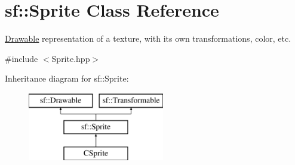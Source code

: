 \hypertarget{classsf_1_1Sprite}{\section{sf\-:\-:Sprite Class Reference}
\label{classsf_1_1Sprite}
}


\hyperlink{classsf_1_1Drawable}{Drawable} representation of a texture, with its own transformations, color, etc.  




{\ttfamily \#include $<$Sprite.\-hpp$>$}

Inheritance diagram for sf\-:\-:Sprite\-:\begin{figure}[H]
\begin{center}
\leavevmode
\includegraphics[height=3.000000cm]{classsf_1_1Sprite}
\end{center}
\end{figure}
